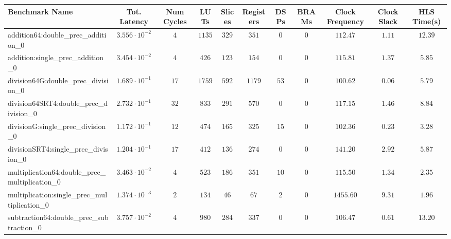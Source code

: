 \begin{tabular}{|l|c|c|c|c|c|c|c|c|c|c|}
\hline
Benchmark Name                                   & Tot. Latency            & Num Cycles & LUTs     & Slices   & Registers & DSPs   & BRAMs & Clock Frequency & Clock Slack & HLS Time(s) \\
\hline
addition64:double\_prec\_addition\_0             & $ 3.556 \cdot 10^{-2} $ & $ 4      $ & $ 1135 $ & $ 329  $ & $ 351   $ & $ 0  $ & $ 0 $ & $ 112.47      $ & $ 1.11    $ & $ 12.39   $ \\
addition:single\_prec\_addition\_0               & $ 3.454 \cdot 10^{-2} $ & $ 4      $ & $ 426  $ & $ 123  $ & $ 154   $ & $ 0  $ & $ 0 $ & $ 115.81      $ & $ 1.37    $ & $ 5.85    $ \\
division64G:double\_prec\_division\_0            & $ 1.689 \cdot 10^{-1} $ & $ 17     $ & $ 1759 $ & $ 592  $ & $ 1179  $ & $ 53 $ & $ 0 $ & $ 100.62      $ & $ 0.06    $ & $ 5.79    $ \\
division64SRT4:double\_prec\_division\_0         & $ 2.732 \cdot 10^{-1} $ & $ 32     $ & $ 833  $ & $ 291  $ & $ 570   $ & $ 0  $ & $ 0 $ & $ 117.15      $ & $ 1.46    $ & $ 8.84    $ \\
divisionG:single\_prec\_division\_0              & $ 1.172 \cdot 10^{-1} $ & $ 12     $ & $ 474  $ & $ 165  $ & $ 325   $ & $ 15 $ & $ 0 $ & $ 102.36      $ & $ 0.23    $ & $ 3.28    $ \\
divisionSRT4:single\_prec\_division\_0           & $ 1.204 \cdot 10^{-1} $ & $ 17     $ & $ 412  $ & $ 136  $ & $ 274   $ & $ 0  $ & $ 0 $ & $ 141.20      $ & $ 2.92    $ & $ 5.87    $ \\
multiplication64:double\_prec\_multiplication\_0 & $ 3.463 \cdot 10^{-2} $ & $ 4      $ & $ 523  $ & $ 186  $ & $ 351   $ & $ 10 $ & $ 0 $ & $ 115.50      $ & $ 1.34    $ & $ 2.35    $ \\
multiplication:single\_prec\_multiplication\_0   & $ 1.374 \cdot 10^{-3} $ & $ 2      $ & $ 134  $ & $ 46   $ & $ 67    $ & $ 2  $ & $ 0 $ & $ 1455.60     $ & $ 9.31    $ & $ 1.96    $ \\
subtraction64:double\_prec\_subtraction\_0       & $ 3.757 \cdot 10^{-2} $ & $ 4      $ & $ 980  $ & $ 284  $ & $ 337   $ & $ 0  $ & $ 0 $ & $ 106.47      $ & $ 0.61    $ & $ 13.20   $ \\

\end{tabular}
